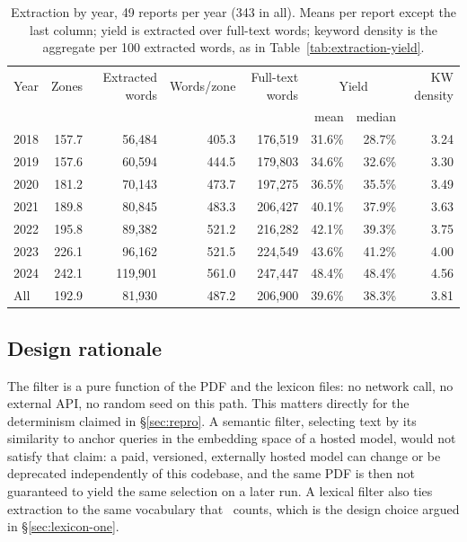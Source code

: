 \begin{table}[tbp]
\centering
\small
\caption{Extraction by year, 49 reports per year (343 in all). Means per
report except the last column; yield is extracted over full-text words;
keyword density is the aggregate per 100 extracted words, as in
Table~\ref{tab:extraction-yield}.}
\label{tab:extraction-by-year}
\setlength{\tabcolsep}{4pt}
\begin{tabular}{lrrrrrrr}
\toprule
Year & Zones & Extracted words & Words/zone & Full-text words & \multicolumn{2}{c}{Yield} & KW density \\
\cmidrule(lr){6-7}
 & & & & & mean & median & \\
\midrule
2018 & 157.7 & 56,484 & 405.3 & 176,519 & 31.6\% & 28.7\% & 3.24 \\
2019 & 157.6 & 60,594 & 444.5 & 179,803 & 34.6\% & 32.6\% & 3.30 \\
2020 & 181.2 & 70,143 & 473.7 & 197,275 & 36.5\% & 35.5\% & 3.49 \\
2021 & 189.8 & 80,845 & 483.3 & 206,427 & 40.1\% & 37.9\% & 3.63 \\
2022 & 195.8 & 89,382 & 521.2 & 216,282 & 42.1\% & 39.3\% & 3.75 \\
2023 & 226.1 & 96,162 & 521.5 & 224,549 & 43.6\% & 41.2\% & 4.00 \\
2024 & 242.1 & 119,901 & 561.0 & 247,447 & 48.4\% & 48.4\% & 4.56 \\
\midrule
All & 192.9 & 81,930 & 487.2 & 206,900 & 39.6\% & 38.3\% & 3.81 \\
\bottomrule
\end{tabular}
\end{table}

\subsection{Design rationale}

The filter is a pure function of the PDF and the lexicon files: no network
call, no external API, no random seed on this path. This matters directly
for the determinism claimed in \S\ref{sec:repro}. A semantic filter, selecting
text by its similarity to anchor queries in the embedding space of a hosted
model, would not satisfy that claim: a paid, versioned, externally hosted
model can change or be deprecated independently of this codebase, and the
same PDF is then not guaranteed to yield the same selection on a later run.
A lexical filter also ties extraction to the same vocabulary that \SUS\
counts, which is the design choice argued in \S\ref{sec:lexicon-one}.

